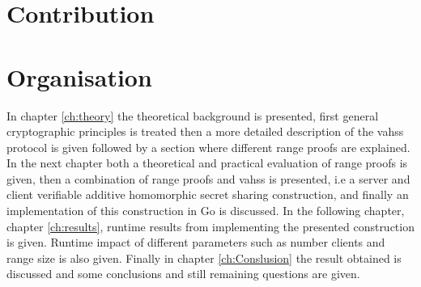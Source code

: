 \section{Contribution}
\section{Organisation}
In chapter \ref{ch:theory} the theoretical background is presented, first general cryptographic principles is treated then a more detailed description of the vahss protocol is given followed by a section where different range proofs are explained. In the next chapter both a theoretical and practical evaluation of range proofs is given, then a combination of range proofs and vahss is presented, i.e a server and client verifiable additive homomorphic secret sharing construction, and finally an implementation of this construction in Go is discussed. In the following chapter, chapter  \ref{ch:results}, runtime results from implementing the presented construction is given. Runtime impact of different parameters such as number clients and range size is also given. Finally in chapter  \ref{ch:Conslusion} the result obtained is discussed and some conclusions and still remaining questions are given. 


